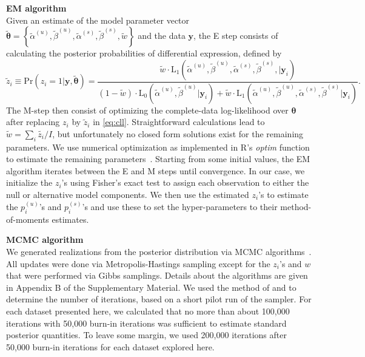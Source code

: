 \documentclass[12pt,oupdraft]{biostatistics}
\begin{document}
\noindent\textbf{EM algorithm}\\
Given an estimate of the model parameter vector $\tilde{\boldsymbol{\theta}}=\left\{\tilde{\alpha}^{(u)},\tilde{\beta}^{(u)},\tilde{\alpha}^{(s)},\tilde{\beta}^{(s)},\tilde{w}\right\}$ and the data $\mathbf{y}$, the E step consists of calculating the posterior probabilities of differential expression, defined by
\[
\tilde z_{i} \equiv \mathrm{Pr}(z_i=1|\mathbf{y},\tilde{\boldsymbol{\theta}})=\frac{\tilde{w} \cdot \mathrm{L}_1(\tilde{\alpha}^{(u)},\tilde{\beta}^{(u)},\tilde{\alpha}^{(s)},\tilde{\beta}^{(s)},|\mathbf{y}_i)}{(1-\tilde{w})\cdot\mathrm{L}_0(\tilde{\alpha}^{(u)},\tilde{\beta}^{(u)}|\mathbf{y}_i)+\tilde{w}\cdot\mathrm{L}_1(\tilde{\alpha}^{(u)},\tilde{\beta}^{(u)},\tilde{\alpha}^{(s)},\tilde{\beta}^{(s)}|\mathbf{y}_i)}.
\]
The M-step then consist of optimizing the complete-data log-likelihood over $\boldsymbol{\theta}$ after replacing $z_i$ by $\tilde{z}_{i}$ in \eqref{eq:cll}. Straightforward calculations lead to
$\tilde w = \sum_i{\tilde{z_i}}/I$, but unfortunately no closed form solutions exist for the remaining parameters. We use numerical optimization as implemented in R's \textit{optim} function to estimate the remaining parameters~\citep{Ihaka:1996ud}.  Starting from some initial values, the EM algorithm iterates between the E and M steps until convergence. In our case, we initialize the $z_{i}$'s using Fisher's exact test to assign each observation to either the null or alternative model components. We then use the estimated $z_i$'s to estimate the $p^{(u)}_{i}$'s and $p^{(s)}_{i}$'s and use these to set the hyper-parameters to their method-of-moments estimates.

\noindent\textbf{MCMC algorithm}\\
We generated realizations from the posterior distribution via MCMC algorithms~\citep{Gelfand:1996wc}. All updates were done via Metropolis-Hastings sampling except for the $z_i$'s and $w$ that were performed via Gibbs samplings.
Details about the algorithms are given in Appendix B of the Supplementary Material. We used the
method of \cite{Raftery:1992vp} and \cite{Raftery:1996ws} to determine
the number of iterations, based on a short pilot run of the
sampler. For each dataset presented here, we calculated that no more
than about 100,000 iterations with 50,000 burn-in iterations was sufficient to estimate standard posterior quantities. To leave some margin, we used 200,000 iterations after 50,000 burn-in iterations for each dataset explored here.
\end{document}
